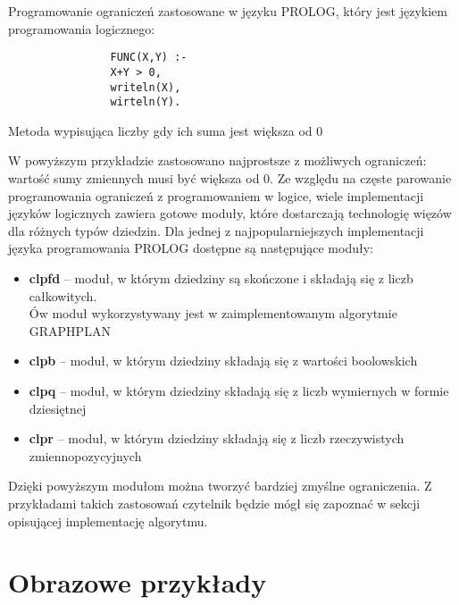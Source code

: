     \begin{example}
        Programowanie ograniczeń zastosowane w języku PROLOG, który jest językiem programowania logicznego:
        \begin{listing}[H]
            \begin{verbatim}
                FUNC(X,Y) :-
                X+Y > 0,
                writeln(X),
                wirteln(Y).
            \end{verbatim}
            \caption{Metoda wypisująca liczby gdy ich suma jest większa od 0}
        \end{listing}
    \end{example}
    W powyższym przykładzie zastosowano najprostsze z możliwych ograniczeń: wartość sumy zmiennych musi być większa od 0. 
    Ze względu na częste parowanie programowania ograniczeń z programowaniem w logice, wiele implementacji języków logicznych zawiera
    gotowe moduły, które dostarczają technologię więzów dla różnych typów dziedzin. Dla
    jednej z najpopularniejszych implementacji języka programowania PROLOG dostępne są następujące moduły:
    \begin{itemize}
        \item \textbf{clpfd} -- moduł, w którym dziedziny są skończone i składają się z liczb całkowitych. \\
        Ów moduł 
        wykorzystywany jest w zaimplementowanym algorytmie GRAPHPLAN
        \item \textbf{clpb} -- moduł, w którym dziedziny składają się z wartości boolowskich
        \item \textbf{clpq} -- moduł, w którym dziedziny składają się z liczb wymiernych w formie dziesiętnej
        \item \textbf{clpr} -- moduł, w którym dziedziny składają się z liczb rzeczywistych zmiennopozycyjnych 
    \end{itemize}
    Dzięki powyższym modułom można tworzyć bardziej zmyślne ograniczenia. Z przykładami takich zastosowań
    czytelnik będzie mógł się zapoznać w sekcji opisującej implementację algorytmu.

\section{Obrazowe przykłady}
